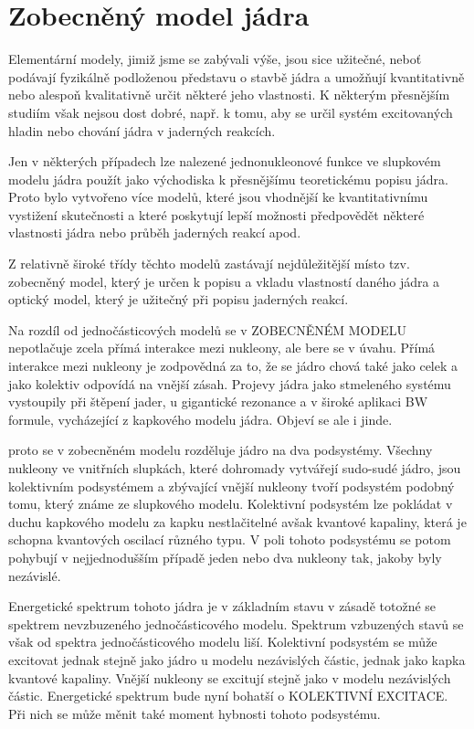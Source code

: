 \documentclass[../../main.tex]{subfiles}
\begin{document}
\section{Zobecněný model jádra}

Elementární modely, jimiž jsme se zabývali výše, jsou sice užitečné, neboť podávají fyzikálně podloženou představu o stavbě jádra a umožňují kvantitativně nebo alespoň kvalitativně určit některé jeho vlastnosti. K některým přesnějším studiím však nejsou dost dobré, např. k tomu, aby se určil systém excitovaných hladin nebo chování jádra v jaderných reakcích. 

Jen v některých případech lze nalezené jednonukleonové funkce ve slupkovém modelu jádra použít jako východiska k přesnějšímu teoretickému popisu jádra. Proto bylo vytvořeno více modelů, které jsou vhodnější ke kvantitativnímu vystižení skutečnosti a které poskytují lepší možnosti předpovědět některé vlastnosti jádra nebo průběh jaderných reakcí apod.

Z relativně široké třídy těchto modelů zastávají nejdůležitější místo tzv. zobecněný model, který je určen k popisu a vkladu vlastností daného jádra a optický model, který je užitečný při popisu jaderných reakcí.

Na rozdíl od jednočásticových modelů se v ZOBECNĚNÉM MODELU nepotlačuje zcela přímá interakce mezi nukleony, ale bere se v úvahu.  Přímá interakce mezi nukleony je zodpovědná za to, že se jádro chová také jako celek a jako kolektiv odpovídá na vnější zásah. Projevy jádra jako stmeleného systému vystoupily při štěpení jader, u gigantické rezonance a v široké aplikaci BW formule, vycházející z kapkového modelu jádra. Objeví se ale i jinde.

proto se v zobecněném modelu rozděluje jádro na dva podsystémy. Všechny nukleony ve vnitřních slupkách, které dohromady vytvářejí sudo-sudé jádro, jsou kolektivním podsystémem a zbývající vnější nukleony tvoří podsystém podobný tomu, který známe ze slupkového modelu. Kolektivní podsystém lze pokládat v duchu kapkového modelu za kapku nestlačitelné avšak kvantové kapaliny, která je schopna kvantových oscilací různého typu. V poli tohoto podsystému se potom pohybují v nejjednodušším případě jeden nebo dva nukleony tak, jakoby byly nezávislé.

Energetické spektrum tohoto jádra je v základním stavu v zásadě totožné se spektrem nevzbuzeného jednočásticového modelu. Spektrum vzbuzených stavů se však od spektra jednočásticového modelu liší. Kolektivní podsystém se může excitovat jednak stejně jako jádro u modelu nezávislých částic, jednak jako kapka kvantové kapaliny. Vnější nukleony se excitují stejně jako v modelu nezávislých částic. Energetické spektrum bude nyní bohatší o KOLEKTIVNÍ EXCITACE. Při nich se může měnit také moment hybnosti tohoto podsystému. 
\end{document}
